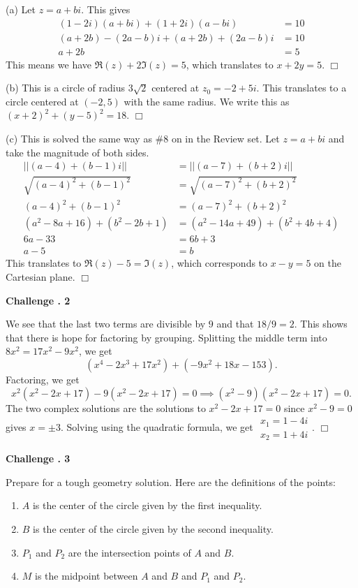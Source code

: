 \documentclass[lang=en,11pt]{elegantbook}
\begin{document}
(a) Let $z=a+bi$.  This gives \begin{align*}
    (1-2i)(a+bi)+(1+2i)(a-bi)&=10 \\
    (a+2b)-(2a-b)i + (a+2b)+(2a-b)i&=10 \\
    a+2b&=5
\end{align*}
This means we have $\Re(z)+2\Im(z)=5$, which translates to $\boxed{x+2y=5}.$ $\Box$

(b) This is a circle of radius $3\sqrt{2}$ centered at $z_0=-2+5i$.  This translates to a circle centered at $(-2,5)$ with the same radius.  We write this as $\boxed{(x+2)^2+(y-5)^2=18}.$ $\Box$

(c) This is solved the same way as $\# 8$ on in the Review set. Let $z=a+bi$ and take the magnitude of both sides. \begin{align*}
    ||(a-4)+(b-1)i|| &= ||(a-7)+(b+2)i|| \\
    \sqrt{(a-4)^2+(b-1)^2} &= \sqrt{(a-7)^2+(b+2)^2} \\
    (a-4)^2+(b-1)^2&=(a-7)^2+(b+2)^2 \\
    (a^2-8a+16)+(b^2-2b+1)&=(a^2-14a+49)+(b^2+4b+4) \\
    6a-33&= 6b+3 \\
    a-5&=b
\end{align*}
This translates to $\Re(z)-5=\Im(z)$, which corresponds to $\boxed{x-y=5}$ on the Cartesian plane. $\Box$\vspace{3mm}

\noindent \textbf{Challenge . 2}

We see that the last two terms are divisible by $9$ and that $18/9=2$.  This shows that there is hope for factoring by grouping.  Splitting the middle term into $8x^2=17x^2-9x^2$, we get $$(x^4-2x^3+17x^2)+(-9x^2+18x-153).$$  Factoring, we get $$x^2(x^2-2x+17)-9(x^2-2x+17)=0 \implies (x^2-9)(x^2-2x+17)=0.$$ The two complex solutions are the solutions to $x^2-2x+17=0$ since $x^2-9=0$ gives $x=\pm 3$. Solving using the quadratic formula, we get $\boxed{\begin{matrix} x_1=1-4i \\ x_2=1+4i \end{matrix}}.$ $\Box$\vspace{3mm}

\noindent \textbf{Challenge . 3}

Prepare for a tough geometry solution.  Here are the definitions of the points: \begin{enumerate}
    \item $A$ is the center of the circle given by the first inequality.
    \item $B$ is the center of the circle given by the second inequality.
    \item $P_1$ and $P_2$ are the intersection points of $A$ and $B$.
    \item $M$ is the midpoint between $A$ and $B$ and $P_1$ and $P_2$.
\end{enumerate}
\end{document}
